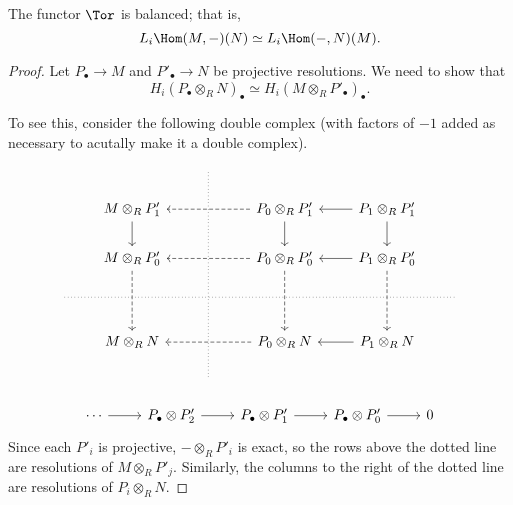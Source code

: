 \documentclass[main.tex]{subfiles}
\begin{document}
\begin{proposition}
  The functor $\Tor$ is balanced; that is,
  \begin{equation*}
    L_{i} \Hom(M, -)(N) \simeq L_{i} \Hom(-, N)(M).
  \end{equation*}
\end{proposition}
\begin{proof}
  Let $P_{\bullet} \to M$ and $P'_{\bullet} \to N$ be projective resolutions. We need to show that
  \begin{equation*}
    H_{i}(P_{\bullet} \otimes_{R} N)_{\bullet} \simeq H_{i}(M \otimes_{R} P'_{\bullet})_{\bullet}.
  \end{equation*}

  To see this, consider the following double complex (with factors of $-1$ added as necessary to acutally make it a double complex).
  \begin{equation*}
    \begin{tikzcd}
      && \
      \arrow[ddddd, no head, dotted]
      \\
      & M \otimes_{R} P'_{1}
      \arrow[d]
      && P_{0} \otimes_{R} P'_{1}
      \arrow[ll, dashed]
      \arrow[d]
      & P_{1} \otimes_{R} P'_{1}
      \arrow[l]
      \arrow[d]
      \\
      & M \otimes_{R} P'_{0}
      \arrow[dd, dashed]
      && P_{0} \otimes_{R} P'_{0}
      \arrow[ll, dashed]
      \arrow[dd, dashed]
      & P_{1} \otimes_{R} P'_{0}
      \arrow[l]
      \arrow[dd, dashed]
      \\
      \
      \arrow[rrrrr, dotted, no head]
      &&&&& \
      \\
      & M \otimes_{R} N
      && P_{0} \otimes_{R} N
      \arrow[ll, dashed]
      & P_{1} \otimes_{R} N
      \arrow[l]
      \\
      && \
    \end{tikzcd}
  \end{equation*}

  \begin{equation*}
    \begin{tikzcd}
      \cdots
      \arrow[r]
      & P_{\bullet} \otimes P'_{2}
      \arrow[r]
      & P_{\bullet} \otimes P'_{1}
      \arrow[r]
      & P_{\bullet} \otimes P'_{0}
      \arrow[r]
      & 0
    \end{tikzcd}
  \end{equation*}
  Since each $P'_{i}$ is projective, $- \otimes_{R} P'_{i}$ is exact, so the rows above the dotted line are resolutions of $M \otimes_{R} P'_{j}$. Similarly, the columns to the right of the dotted line are resolutions of $P_{i} \otimes_{R} N$.


\end{proof}
\end{document}
